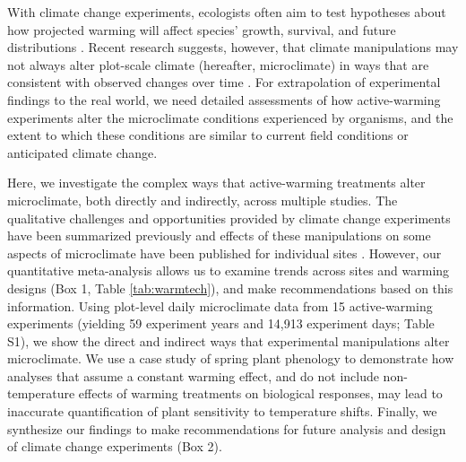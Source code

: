 \documentclass{article}
\begin{document}
\par With climate change experiments, ecologists often aim to test hypotheses about how projected warming will affect species' growth, survival, and future distributions \citep{dukes1999,hobbie1999,morin2010,pelini2011,chuine2012,reich2015,gruner2017}. %
Recent research suggests, however, that climate manipulations may not always alter plot-scale climate (hereafter, microclimate) in ways that are consistent with observed changes over time \citep{wolkovich2012,menke2014,polgar2014,andresen2016}. For extrapolation of experimental findings to the real world, we need detailed assessments of how active-warming experiments alter the microclimate conditions experienced by organisms, and the extent to which these conditions are similar to current field conditions or anticipated climate change. 
\par Here, we investigate the complex ways that active-warming treatments alter microclimate, both directly and indirectly, across multiple studies. The qualitative challenges and opportunities provided by climate change experiments have been summarized previously \citep[e.g.,][]{deboeck2015} and effects of these manipulations on some aspects of microclimate have been published for individual sites \citep[e.g.,][]{harte1995b,mcdaniel2014,pelini2011}. However, our quantitative meta-analysis allows us to examine trends across sites and warming designs (Box 1, Table \ref{tab:warmtech}), and make recommendations based on this information. Using plot-level daily microclimate data from 15 active-warming experiments (yielding 59 experiment years and 14,913 experiment days; Table S1), we show the direct and indirect ways that experimental manipulations alter microclimate. We use a case study of spring plant phenology to demonstrate how analyses that assume a constant warming effect, and do not include non-temperature effects of warming treatments on biological responses, may lead to inaccurate quantification of plant sensitivity to temperature shifts. Finally, we synthesize our findings to make recommendations for future analysis and design of climate change experiments (Box 2). 
\end{document}
